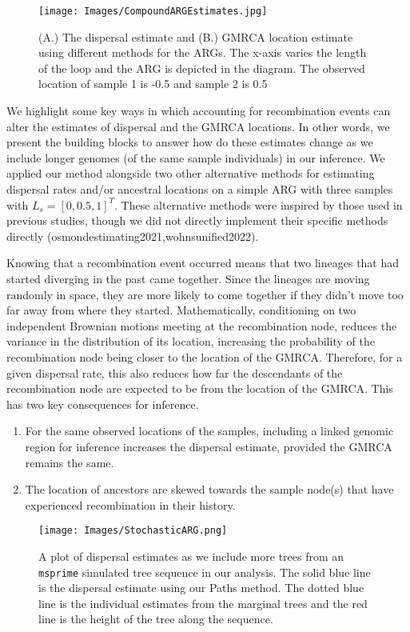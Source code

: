 \begin{figure}[h]
    \centering
    \texttt{[image: Images/CompoundARGEstimates.jpg]}
    \caption{(A.) The dispersal estimate and (B.) GMRCA location estimate using different methods for the ARGs. The x-axis varies the length of the loop and the ARG is depicted in the diagram. The observed location of sample 1 is -0.5 and sample 2 is 0.5}
    \label{fig:Bubble}
\end{figure}

We highlight some key ways in which accounting for recombination events can alter the estimates of dispersal and the GMRCA locations. In other words, we present the building blocks to answer how do these estimates change as we include longer genomes (of the same sample individuals) in our inference. We applied our method alongside two other alternative methods for estimating dispersal rates and/or ancestral locations on a simple ARG with three samples with $L_s=[0,0.5,1]^T$. These alternative methods were inspired by those used in previous studies, though we did not directly implement their specific methods directly (osmondestimating2021,wohnsunified2022).

Knowing that a recombination event occurred means that two lineages that had started diverging in the past came together. Since the lineages are moving randomly in space, they are more likely to come together if they didn't move too far away from where they started. Mathematically, conditioning on two independent Brownian motions meeting at the recombination node, reduces the variance in the distribution of its location, increasing the probability of the recombination node being closer to the location of the GMRCA. Therefore, for a given dispersal rate, this also reduces how far the descendants of the recombination node are expected to be from the location of the GMRCA. 
This has two key consequences for inference.
\begin{enumerate}
    \item For the same observed locations of the samples, including a linked genomic region for inference increases the dispersal estimate, provided the GMRCA remains the same. 
    \item The location of ancestors are skewed towards the sample node(s) that have experienced recombination in their history.     
\end{enumerate}

\begin{figure}[h]
    \centering
    \texttt{[image: Images/StochasticARG.png]}
    \caption{A plot of dispersal estimates as we include more trees from an {\tt msprime} simulated tree sequence in our analysis. The solid blue line is the dispersal estimate using our Paths method. The dotted blue line is the individual estimates from the marginal trees and the red line is the height of the tree along the sequence.}
    \label{fig:StochARG}
\end{figure}

